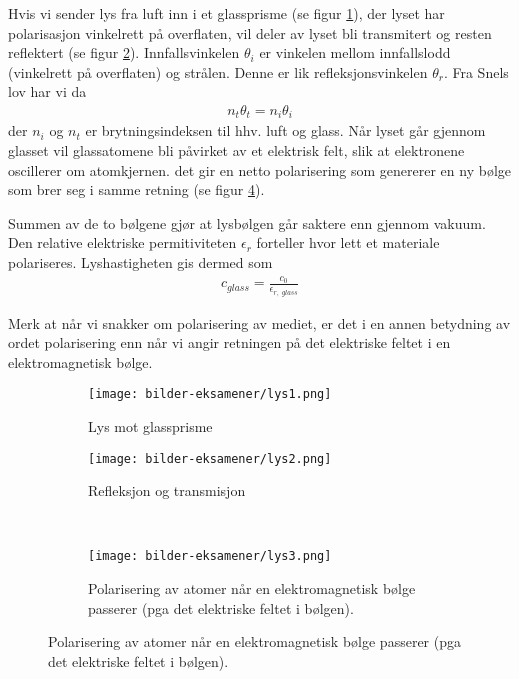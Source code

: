 \documentclass[12pt]{article}
\numberwithin{equation}{section}
\numberwithin{figure}{section}
\newcommand{\eq}[1]{{\small\begin{align}#1\end{align}}}
\begin{document}
\begin{tcolorbox}[title = Lys gjennom glassprisme]
  Hvis vi sender lys fra luft inn i et glassprisme (se figur \ref{fig:1a}), 
  der lyset har polarisasjon vinkelrett på
  overflaten, vil deler av lyset bli transmitert 
  og resten reflektert (se figur \ref{fig:1b}).
  Innfallsvinkelen $\theta_i$ er vinkelen mellom innfallslodd (vinkelrett på overflaten)
  og strålen. Denne er lik refleksjonsvinkelen $\theta_r$.
  Fra Snels lov har vi da
  \eq{n_t \theta_t = n_i \theta_i}
  der $n_i$ og $n_t$ er brytningsindeksen til hhv. luft og glass.
  \tcbline
  Når lyset går gjennom glasset vil glassatomene bli påvirket av et
  elektrisk felt, slik at elektronene oscillerer om atomkjernen.
  det gir en netto polarisering som genererer en ny bølge som brer seg i samme retning
  (se figur \ref{fig:1c}).
  
  Summen av de to bølgene gjør at lysbølgen går saktere enn gjennom vakuum.
  Den relative elektriske permitiviteten $\epsilon_r$ forteller hvor
  lett et materiale polariseres. Lyshastigheten gis dermed som
  \eq{c_{glass} = \frac{c_0}{\epsilon_{r,\;glass}}}
  
  Merk at når vi snakker om polarisering av mediet, er det i en annen betydning av ordet
polarisering enn når vi angir retningen på det elektriske feltet i en elektromagnetisk bølge.
\tcbline

\end{tcolorbox}

\begin{figure}[h!]
  \caption{}
  \begin{subfigure}[b]{0.5\textwidth}
  	\texttt{[image: bilder-eksamener/lys1.png]}
  	\caption{Lys mot glassprisme}\label{fig:1a}
  \end{subfigure}
    \begin{subfigure}[b]{0.5\textwidth}
  	\texttt{[image: bilder-eksamener/lys2.png]}
  	  	\caption{Refleksjon og transmisjon}\label{fig:1b}
  \end{subfigure}\\
    \begin{subfigure}[b]{\textwidth}
  	\texttt{[image: bilder-eksamener/lys3.png]}
  	  	\caption{Polarisering av atomer når en elektromagnetisk bølge passerer (pga det elektriske
feltet i bølgen).}\label{fig:1c}
  \end{subfigure}  
\end{figure}
\end{document}
